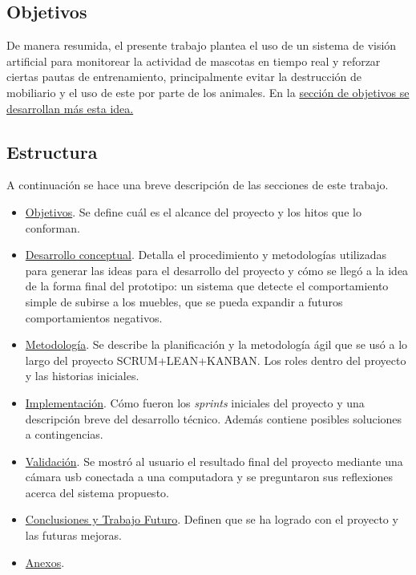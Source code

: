\subsection{Objetivos}

De manera resumida, el presente trabajo plantea el uso de un sistema de visión artificial para monitorear la actividad de mascotas en tiempo real y reforzar ciertas pautas de entrenamiento, principalmente evitar la destrucción de mobiliario y el uso de este por parte de los animales. En la  \hyperref[sec:objetivos]{sección de objetivos se desarrollan más esta idea.}

\subsection{Estructura}

A continuación se hace una breve descripción de las secciones de este trabajo.

\begin{itemize}
  \item \hyperref[sec:objetivos]{Objetivos}. Se define cuál es el alcance del proyecto y los hitos que lo conforman. 
  \item \hyperref[sec:desarrolloconceptual]{Desarrollo conceptual}. Detalla el procedimiento y metodologías utilizadas para generar las ideas para el desarrollo del proyecto y cómo se llegó a la idea de la forma final del prototipo: un sistema que detecte el comportamiento simple de subirse a los muebles, que se pueda expandir a futuros comportamientos negativos.
  \item \hyperref[sec:metodologia]{Metodología}. Se describe la planificación y la metodología ágil que se usó a lo largo del proyecto SCRUM+LEAN+KANBAN. Los roles dentro del proyecto y las historias iniciales.
  \item \hyperref[sec:implementacion]{Implementación}. Cómo fueron los \textit{sprints} iniciales del proyecto y una descripción breve del desarrollo técnico. Además contiene posibles soluciones a contingencias.
  \item \hyperref[sec:validacion]{Validación}. Se mostró al usuario el resultado final del proyecto mediante una cámara usb conectada a una computadora y se preguntaron sus reflexiones acerca del sistema propuesto.
  \item \hyperref[sec:conclusiones]{Conclusiones y Trabajo Futuro}. Definen que se ha logrado con el proyecto y las futuras mejoras.
  \item \hyperref[ape:tablaencuesta]{Anexos}.
\end{itemize}


